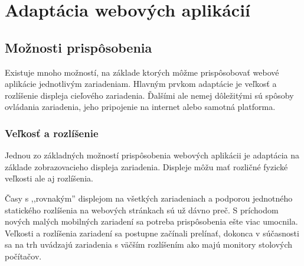 


\section{Adaptácia webových aplikácií} %
\label{sec:adapt_cia}

\subsection{Možnosti prispôsobenia} %
\label{sub:mo_nosti_prisp_sobenia}

Existuje mnoho možností, na základe ktorých môžme prispôsobovať webové aplikácie jednotlivým zariadeniam. Hlavným prvkom adaptácie je veľkosť a rozlíšenie displeja cieľového zariadenia. Ďalšími ale nemej dôležitými sú spôsoby ovládania zariadenia, jeho pripojenie na internet alebo samotná platforma.

\subsubsection{Veľkosť a rozlíšenie} %
\label{ssub:ve_kos_a_rozl_enie}

Jednou zo základných možností prispôsobenia webových aplikácii je adaptácia na základe zobrazovacieho displeja zariadenia. Displeje môžu mať rozličné fyzické veľkosti ale aj rozlíšenia.

Časy s ,,rovnakým'' displejom na všetkých zariadeniach a podporou jednotného statického rozlíšenia na webových stránkach sú už dávno preč. S príchodom nových malých mobilných zariadení sa potreba prispôsobenia ešte viac umocnila. Veľkosti a rozlíšenia zariadení sa postupne začínali prelínať, dokonca v súčasnosti sa na trh uvádzajú zariadenia s väčším rozlíšením ako majú monitory stolových počítačov.


